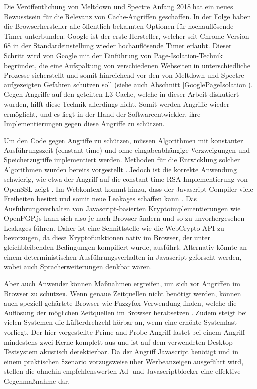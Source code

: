 Die Veröffentlichung von Meltdown und Spectre Anfang 2018 hat ein neues Bewusstsein für die Relevanz von Cache-Angriffen geschaffen.
In der Folge haben die Browserhersteller alle öffentlich bekannten Optionen für hochauflösende Timer unterbunden.
Google ist der erste Hersteller, welcher seit Chrome Version 68 in der Standardeinstellung wieder hochauflösende Timer erlaubt.
Dieser Schritt wird von Google mit der Einführung von Page-Isolation-Technik \cite{ChromeSiteIsolation} begründet, die eine Aufspaltung von verschiedenen Webseiten in unterschiedliche Prozesse sicherstellt und somit hinreichend vor den von Meltdown und Spectre aufgezeigten Gefahren schützen soll (siehe auch Abschnitt \ref{GooglePageIsolation}).
Gegen Angriffe auf den geteilten L3-Cache, welche in dieser Arbeit diskutiert wurden, hilft diese Technik allerdings nicht.
Somit werden Angriffe wieder ermöglicht, und es liegt in der Hand der Softwareentwickler, ihre Implementierungen gegen diese Angriffe zu schützen.

Um den Code gegen Angriffe zu schützen, müssen Algorithmen mit konstanter Ausführungszeit (constant-time) und ohne eingabeabhängige Verzweigungen und Speicherzugriffe implementiert werden.
Methoden für die Entwicklung solcher Algorithmen wurden bereits vorgestellt \cite{ConstTimeAlgorithm}.
Jedoch ist die korrekte Anwendung schwierig, wie etwa der Angriff auf die constant-time RSA-Implementierung von OpenSSL zeigt \cite{CacheBleed}.
Im Webkontext kommt hinzu, dass der Javascript-Compiler viele Freiheiten besitzt und somit neue Leakages schaffen kann \cite{DriveByPaper}.
Das Ausführungsverhalten von Javascript-basierten Kryptoimplementierungen wie OpenPGP.js kann sich also je nach Browser ändern und so zu unvorhergesehen Leakages führen.
Daher ist eine Schnittstelle wie die WebCrypto API \cite{WebCryptoAPI} zu bevorzugen, da diese Kryptofunktionen nativ im Browser, der unter gleichbleibenden Bedingungen kompiliert wurde, ausführt.
Alternativ könnte an einem deterministischen Ausführungsverhalten in Javascript geforscht werden, wobei auch Spracherweiterungen denkbar wären.

Aber auch Anwender können Maßnahmen ergreifen, um sich vor Angriffen im Browser zu schützen.
Wenn genaue Zeitquellen nicht benötigt werden, können auch speziell gehärtete Browser wie Fuzzyfox \cite{Fuzzyfox} Verwendung finden, welche die Auflösung der möglichen Zeitquellen im Browser herabsetzen \cite{FantasticTimers}.
Zudem steigt bei vielen Systemen die Lüfterdrehzehl hörbar an, wenn eine erhöhte Systemlast vorliegt. 
Der hier vorgestellte Prime-and-Probe-Angriff lastet bei einem Angriff mindestens zwei Kerne komplett aus und ist auf dem verwendeten Desktop-Testsystem akustisch detektierbar.
Da der Angriff Javascript benötigt und in einem praktischen Szenario vorzugsweise über Werbeanzeigen ausgeführt wird, stellen die ohnehin empfehlenswerten Ad- und Javascriptblocker eine effektive Gegenmaßnahme dar.


